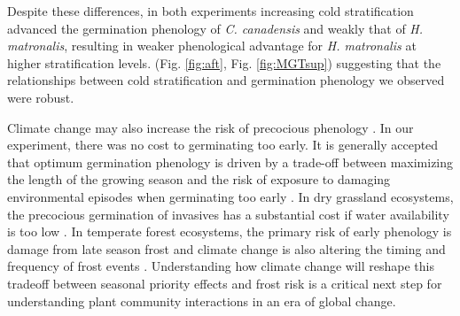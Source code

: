 \documentclass{article}[11pt]
\begin{document}
Despite these differences, in both experiments increasing cold stratification advanced the germination phenology of \textit{C. canadensis} and weakly that of \textit{H. matronalis}, resulting in weaker phenological advantage for \textit{H. matronalis} at higher stratification levels. (Fig. \ref{fig:aft}, Fig.  \ref{fig:MGTsup}) suggesting that the relationships between cold stratification and germination phenology we observed were robust. 


Climate change may also increase the risk of precocious phenology \citep{Inouye:2000ud}. In our experiment, there was no cost to germinating too early. It is generally accepted that optimum germination phenology is driven by a trade-off between maximizing the length of the growing season and the risk of exposure to damaging environmental episodes when germinating too early \citep{Augspurger:2017vu}. In dry grassland ecosystems, the precocious germination of invasives has a substantial cost if water availability is too low \citep{Wainwright_2011}. In temperate forest ecosystems, the primary risk of early phenology is damage from late season frost \citep{Kollas:2014vn} and climate change is also altering the timing and frequency of frost events \citep{Ma:2019uf}. Understanding how climate change will reshape this tradeoff between seasonal priority effects and frost risk is a critical next step for understanding plant community interactions in an era of global change. 
\end{document}
